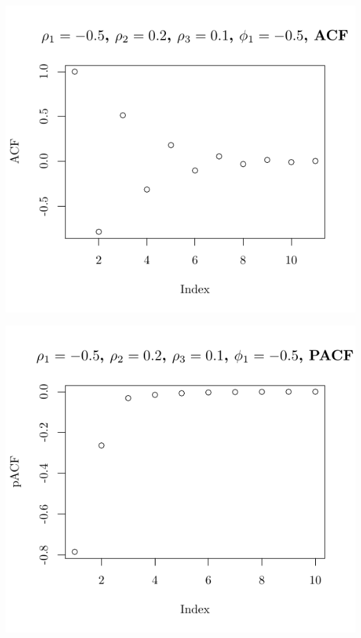 \documentclass[10pt]{paper}\usepackage[]{graphicx}\usepackage[]{color}
\makeatletter
\def\maxwidth{ %
  \ifdim\Gin@nat@width>\linewidth
    \linewidth
  \else
    \Gin@nat@width
  \fi
}
\newenvironment{knitrout}{}{} %
\makeatother
\begin{document}
\begin{knitrout}
{\centering \includegraphics[width=\maxwidth]{figure/graphics-plotter-125} 

}




{\centering \includegraphics[width=\maxwidth]{figure/graphics-plotter-126} 

}





\end{knitrout}
\end{document}
